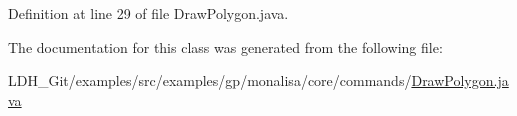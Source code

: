 Definition at line 29 of file Draw\-Polygon.\-java.



The documentation for this class was generated from the following file\-:\begin{DoxyCompactItemize}
\item 
L\-D\-H\-\_\-\-Git/examples/src/examples/gp/monalisa/core/commands/\hyperlink{_draw_polygon_8java}{Draw\-Polygon.\-java}\end{DoxyCompactItemize}
